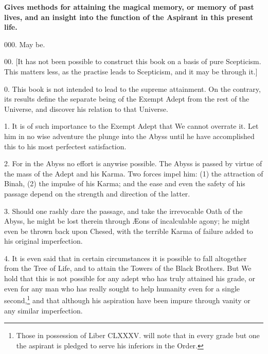 \textbf{Gives methods for attaining the magical memory, or memory of past lives, and an insight into the function of the Aspirant in this present life.}

000. May be.

00. [It has not been possible to construct this book on a basis of pure Scepticism. This matters less, as the practise leads to Scepticism, and it may be through it.]

0. This book is not intended to lead to the supreme attainment. On the contrary, its results define the separate being of the Exempt Adept from the rest of the Universe, and discover his relation to that Universe.

1. It is of such importance to the Exempt Adept that We cannot overrate it. Let him in no wise adventure the plunge into the Abyss until he have accomplished this to his most perfectest satisfaction.

2. For in the Abyss no effort is anywise possible. The Abyss is passed by virtue of the mass of the Adept and his Karma. Two forces impel him: (1) the attraction of Binah, (2) the impulse of his Karma; and the ease and even the safety of his passage depend on the strength and direction of the latter.

3. Should one rashly dare the passage, and take the irrevocable Oath of the Abyss, he might be lost therein through \AE{}ons of incalculable agony; he might even be thrown back upon Chesed, with the terrible Karma of failure added to his original imperfection.

4. It is even said that in certain circumstances it is possible to fall altogether from the Tree of Life, and to attain the Towers of the Black Brothers. But We hold that this is not possible for any adept who has truly attained his grade, or even for any man who has really sought to help humanity even for a single second,\footnote{Those in possession of Liber CLXXXV. will note that in every grade but one the aspirant is pledged to serve his inferiors in the Order.} and that although his aspiration have been impure through vanity or any similar imperfection.

